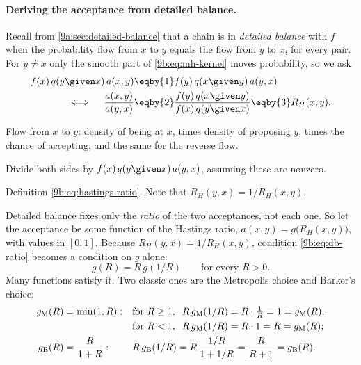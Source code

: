 \paragraph{Deriving the acceptance from detailed balance.}
Recall from \cref{9a:sec:detailed-balance} that a chain is in \emph{detailed balance} with $f$
when the probability flow from $x$ to $y$ equals the flow from $y$ to $x$, for every pair. For
$y\ne x$ only the smooth part of \eqref{9b:eq:mh-kernel} moves probability, so we ask
\begin{align}
  f(x)\,q(y\given x)\,a(x,y)
  &\eqby{1}f(y)\,q(x\given y)\,a(y,x)
  \nonumber\\
  \iff\quad
  \frac{a(x,y)}{a(y,x)}
  &\eqby{2}\frac{f(y)\,q(x\given y)}{f(x)\,q(y\given x)}
   \eqby{3}R_H(x,y).
  \label{9b:eq:db-ratio}
\end{align}
\begin{explain}
  \item Flow from $x$ to $y$: density of being at $x$, times density of proposing $y$, times the
        chance of accepting; and the same for the reverse flow.
  \item Divide both sides by $f(x)\,q(y\given x)\,a(y,x)$, assuming these are nonzero.
  \item Definition \eqref{9b:eq:hastings-ratio}. Note that $R_H(y,x)=1/R_H(x,y)$.
\end{explain}
Detailed balance fixes only the \emph{ratio} of the two acceptances, not each one. So let the
acceptance be some function of the Hastings ratio, $a(x,y)=g\bigl(R_H(x,y)\bigr)$, with values
in $[0,1]$. Because $R_H(y,x)=1/R_H(x,y)$, condition \eqref{9b:eq:db-ratio} becomes a condition
on $g$ alone:
\begin{equation}
  g(R)=R\,g(1/R)\qquad\text{for every }R>0 .
  \label{9b:eq:g-condition}
\end{equation}
Many functions satisfy it. Two classic ones are the Metropolis choice and Barker's choice:
\begin{align*}
  g_{\rm M}(R)&=\min(1,R):
  &&\text{for }R\ge1,\;\;R\,g_{\rm M}(1/R)=R\cdot\tfrac1R=1=g_{\rm M}(R),\\
  &&&\text{for }R<1,\;\;R\,g_{\rm M}(1/R)=R\cdot1=R=g_{\rm M}(R);\\
  g_{\rm B}(R)&=\frac{R}{1+R}:
  &&R\,g_{\rm B}(1/R)=R\,\frac{1/R}{1+1/R}=\frac{R}{R+1}=g_{\rm B}(R).
\end{align*}

